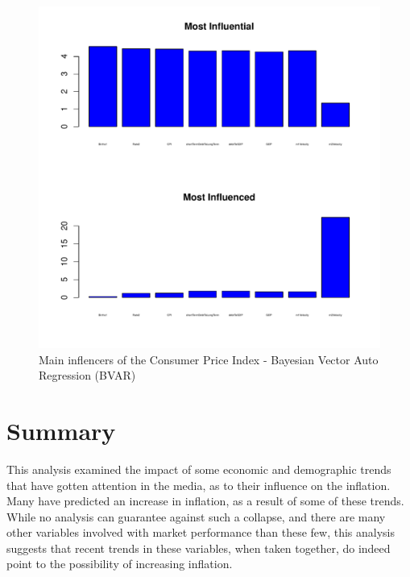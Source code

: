 \documentclass[12pt]{article}         %
\begin{document}
\begin{figure}[!ht]
\begin{center}
\includegraphics[width=\linewidth]{plots/CPI_barchart_not_whitened.pdf}
\caption{Main inflencers of the Consumer Price Index - Bayesian Vector Auto Regression (BVAR)}
\label{fig:BVARInfluencersCPI}
\end{center}
\end{figure}

\section{Summary}

This analysis examined the impact of some economic and demographic trends that have gotten attention in the media, as to their influence on the inflation.  Many have predicted an increase in inflation, as a result of some of these trends.  While no analysis can guarantee against such a collapse, and there are many other variables involved with market performance than these few, this analysis suggests that recent trends in these variables, when taken together, do indeed point to the possibility of increasing inflation.
\end{document}
